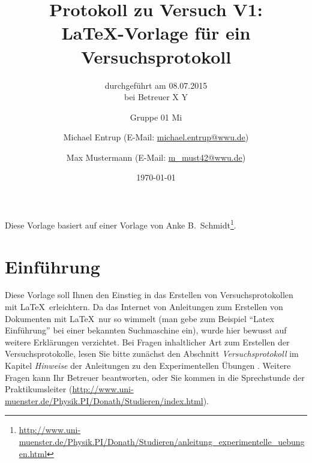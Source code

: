 \documentclass[
	fontsize=11pt,
	paper=a4,
	pagesize=auto,
	parskip=half,
	titlepage=on,
	ngerman
]{scrartcl}
\begin{document}
\title{
	Protokoll zu Versuch V1:\\
	\LaTeX-Vorlage für ein Versuchsprotokoll
}
\subtitle{
	durchgeführt am 08.07.2015\\
	bei Betreuer X Y
}
\author{
	Gruppe 01 Mi\and
	Michael Entrup (E-Mail: \url{michael.entrup@wwu.de}) \and
	Max Mustermann (E-Mail: \url{m_must42@wwu.de})
}
\date{\today}

\maketitle

\newpage

\tableofcontents

\newpage

Diese Vorlage basiert auf einer Vorlage von Anke B.\ Schmidt\footnote{\url{http://www.uni-muenster.de/Physik.PI/Donath/Studieren/anleitung_experimentelle_uebungen.html}}.

\section{Einführung}

Diese Vorlage soll Ihnen den Einstieg in das Erstellen von Versuchsprotokollen mit \LaTeX\ erleichtern. Da das Internet von Anleitungen zum Erstellen von Dokumenten mit \LaTeX\ nur so wimmelt (man gebe zum Beispiel ``Latex Einführung'' bei einer bekannten Suchmaschine ein), wurde hier bewusst auf weitere Erklärungen verzichtet. Bei Fragen inhaltlicher Art zum Erstellen der Versuchsprotokolle, lesen Sie bitte zunächst den Abschnitt \emph{Versuchsprotokoll} im Kapitel \emph{Hinweise} der Anleitungen zu den Experimentellen Übungen \cite{anleitung}. Weitere Fragen kann Ihr Betreuer beantworten, oder Sie kommen in die Sprechstunde der Praktikumsleiter (\url{http://www.uni-muenster.de/Physik.PI/Donath/Studieren/index.html}).
\end{document}
